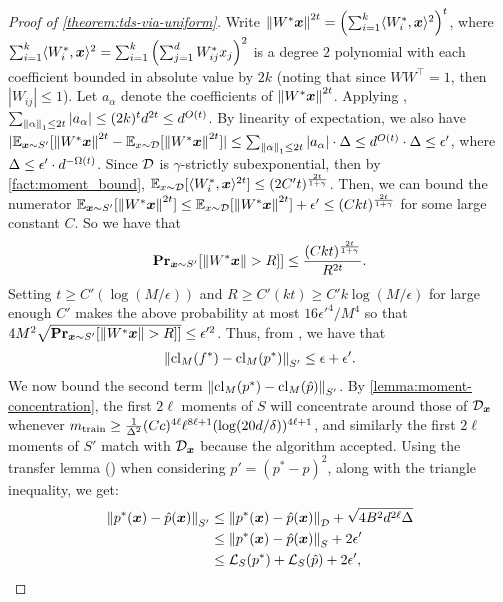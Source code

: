 \documentclass[11pt]{article} %
\numberwithin{equation}{section}
\begin{document}
\begin{proof}[Proof of \cref{theorem:tds-via-uniform}]
    Write $\left\| W^*{\bm{x}} \right\|^{2t} = \left( \sum_{i=1}^k \langle W_i^*, {\bm{x}}\rangle^2 \right)^t$, where $\sum_{i=1}^k \langle W_i^*, {\bm{x}}\rangle^2 = \sum_{i=1}^k \left( \sum_{j=1}^d W_{ij}^* x_j \right)^2$ is a degree $2$ polynomial with each coefficient bounded in absolute value by $2k$ (noting that since $WW^\top = 1$, then $|W_{ij}| \le 1$). Let $a_\alpha$ denote the coefficients of $\left\| W^*{\bm{x}} \right\|^{2t}$. Applying , $\sum_{\left\| \alpha \right\|_1 \le 2t} |a_\alpha| \le (2k)^t d^{2t}\leq d^{O(t)}$. By linearity of expectation, we also have $|\mathbb{E}_{{\bm{x}} \sim S'}[\left\| W^*{\bm{x}} \right\|^{2t} - \mathbb{E}_{x \sim {\mathcal{D}}}[\left\| W^*{\bm{x}} \right\|^{2t}]| \le \sum_{\left\| \alpha \right\|_1 \le 2t} |a_\alpha| \cdot \Delta\leq d^{O(t)}\cdot \Delta\leq \epsilon'$, where $\Delta\leq \epsilon'\cdot d^{-\Omega(t)}$.  Since ${\mathcal{D}}$ is $ \gamma$-strictly subexponential, then by \cref{fact:moment_bound}, $\mathbb{E}_{x \sim {\mathcal{D}}}[\langle W_i^*, {\bm{x}}\rangle^{2t}] \le (2C't)^{\frac{2t}{1+\gamma}}$. Then, we can bound the numerator $\mathbb{E}_{{\bm{x}} \sim S'}[\left\| W^*{\bm{x}} \right\|^{2t}] \le \mathbb{E}_{x \sim {\mathcal{D}}}[\left\| W^*{\bm{x}} \right\|^{2t}] + \epsilon' \le (Ckt)^{\frac{2t}{1+\gamma}}$ for some large constant $C$. So we have that 
    \[
    \mathbf{Pr}_{{\bm{x}} \sim S'}[\left\| W^*{\bm{x}} \right\| >R]] \le \frac{(Ckt)^{\frac{2t}{1+\gamma}}}{R^{2t}}.
    \] Setting $t\geq C'(\log(M/\epsilon))$ and $R \ge C'(kt)\geq C'k\log(M/\epsilon)$ for large enough $C'$ makes the above probability at most $16\epsilon'^4/M^4$ so that $4M^2 \sqrt{\mathbf{Pr}_{{\bm{x}} \sim S'}[\left\| W^*{\bm{x}} \right\| >R]]} \le \epsilon'^2$. Thus, from , we have that
    \begin{equation} \label{eqn: fsM_psM}
    \left\| \mathrm{cl}_M(f^{*}) - \mathrm{cl}_M(p^{*}) \right\|_{S'} \le \epsilon + \epsilon'.
    \end{equation}
    We now bound the second term $\left\| \mathrm{cl}_M(p^{*}) - \mathrm{cl}_M(\hat p) \right\|_{S'}$. By \cref{lemma:moment-concentration}, the first $2\ell$ moments of $S$ will concentrate around those of ${\mathcal{D}}_{{\bm{x}}}$ whenever $m_{\mathrm{train}} \ge \frac{1}{\Delta^2}{(Cc)^{4\ell} \ell^{8\ell +1} (\log(20d/\delta))^{4\ell+1}}$, and similarly the first $2\ell$ moments of $S'$ match with ${\mathcal{D}}_{{\bm{x}}}$ because the algorithm accepted. Using the transfer lemma () when considering $p' = (p^* - \hat{p})^2$, along with the triangle inequality, we get:
    \begin{align*}
        \left\| p^*({\bm{x}}) - \hat{p}({\bm{x}}) \right\|_{S'} &\le \left\| p^*({\bm{x}}) - \hat{p}({\bm{x}}) \right\|_{{\mathcal{D}}} + \sqrt{4B^2d^{2\ell}\Delta} \\
        &\le \left\| p^*({\bm{x}}) - \hat{p}({\bm{x}}) \right\|_S + 2\epsilon' \\
        &\le {\mathcal{L}}_S({p^*}) + {\mathcal{L}}_S(\hat{p}) + 2\epsilon',
    \end{align*}

\end{proof}
\end{document}
